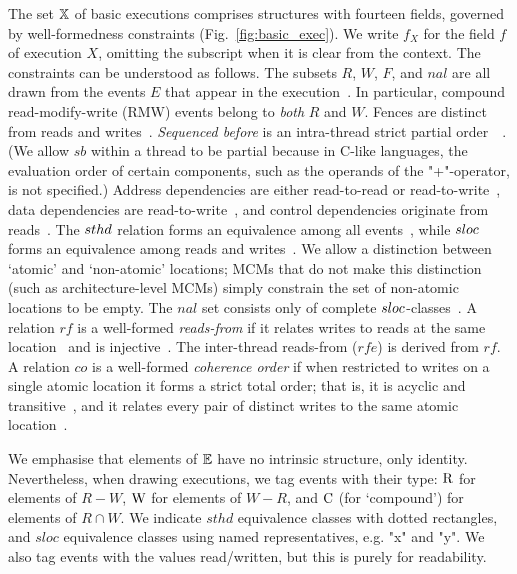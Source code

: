 \begin{definition} 
%
The set $\mathbb{X}$ of basic executions comprises structures with fourteen
fields, governed by well-formed\-ness constraints
(Fig.~\ref{fig:basic_exec}). We write $f_X$ for the field $f$ of
execution $X$, omitting the subscript when it is clear from the
context. The constraints can be understood as follows. The subsets
$R$, $W$, $F$, and $nal$ are all drawn from the events $E$ that appear
in the execution~. In particular,
compound read-modify-write (RMW) events belong to \emph{both} $R$ and $W$.
Fences are distinct from reads and writes~.
\emph{Sequenced before} is an intra-thread strict partial
order~~. (We allow
$sb$ within a thread to be partial because in C-like languages, the
evaluation order of certain components, such as the operands of the
"+"-operator, is not specified.) Address dependencies are either
read-to-read or read-to-write~, data
dependencies are read-to-write~, and control
dependencies originate from reads~. The $sthd$
relation forms an equivalence among all
events~, while $sloc$ forms an
equivalence among reads and writes~. We
allow a distinction between `atomic' and `non-atomic' locations; MCMs
that do not make this distinction (such as architecture-level MCMs) simply constrain the set of
non-atomic locations to be empty. The $nal$ set consists only of
complete $sloc$-classes~. A relation $rf$
is a well-formed \emph{reads-from} if it relates writes to reads at
the same location~ and is injective~.
The inter-thread reads-from ($rfe$) is derived from $rf$. A relation
$co$ is a well-formed \emph{coherence order} if when restricted to
writes on a single atomic location it forms a strict total order; that
is, it is acyclic and transitive~, and it relates every
pair of distinct writes to the same atomic location~.
\end{definition}

\begin{remark}
%
We emphasise that elements of $\mathbb{E}$ have no intrinsic structure, only
identity. Nevertheless, when drawing executions, we tag events with
their type: ${\rm R}$ for elements of $R-W$, ${\rm W}$ for elements of
$W-R$, and ${\rm C}$ (for `compound') for elements of $R\cap W$. We
indicate $sthd$ equivalence classes with dotted rectangles, and $sloc$
equivalence classes using named representatives, e.g. "x" and "y". We
also tag events with the values read/written, but this is purely for
readability.
%
\end{remark}


